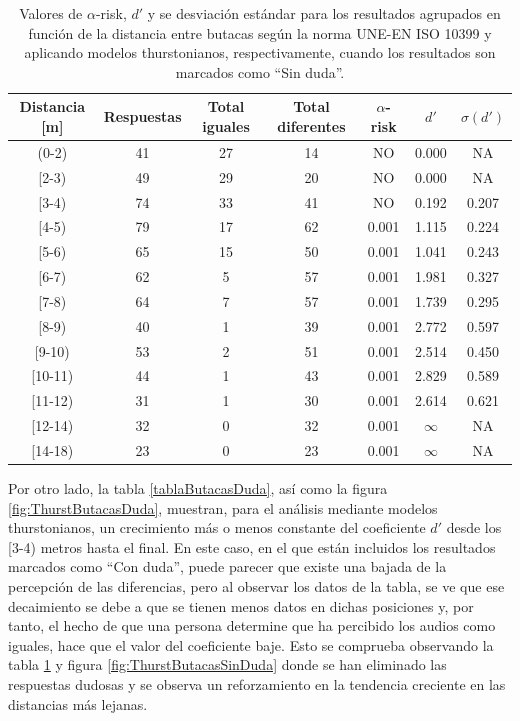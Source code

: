 \documentclass[11pt,a4paper,twoside]{book}
\begin{document}
		    \begin{table}[H]
			\begin{center}
			\begin{scriptsize}
			\begin{tabular}{| c | c | c | c || c | c | c |}
			    \hline
				\textbf{Distancia [m]}&\textbf{Respuestas}&\textbf{Total iguales}&\textbf{Total diferentes}&\textbf{$\alpha$-risk}&\textbf{$d'$}&\textbf{$\sigma (d')$}\\ \hline
                (0-2)&41&27&14&NO&0.000&NA\\ \hline
                [2-3)&49&29&20&NO&0.000&NA\\ \hline
                [3-4)&74&33&41&NO&0.192&0.207\\ \hline
                [4-5)&79&17&62&0.001&1.115&0.224\\ \hline
                [5-6)&65&15&50&0.001&1.041&0.243\\ \hline
                [6-7)&62&5&57&0.001&1.981&0.327\\ \hline
                [7-8)&64&7&57&0.001&1.739&0.295\\ \hline
                [8-9)&40&1&39&0.001&2.772&0.597\\ \hline
                [9-10)&53&2&51&0.001&2.514&0.450\\ \hline
                [10-11)&44&1&43&0.001&2.829&0.589\\ \hline
                [11-12)&31&1&30&0.001&2.614&0.621\\ \hline
                [12-14)&32&0&32&0.001&$\infty$&NA\\ \hline
                [14-18)&23&0&23&0.001&$\infty$&NA\\ \hline
			\end{tabular}
			\caption{Valores de $\alpha$-risk, $d'$ y se desviación estándar para los resultados agrupados en función de la distancia entre butacas según la norma UNE-EN ISO 10399 y aplicando modelos thurstonianos, respectivamente, cuando los resultados son marcados como ``Sin duda''.}
			\label{tablaButacasSinDuda}
			\end{scriptsize}
			\end{center}	
		    \end{table}
            
            
            Por otro lado, la tabla \ref{tablaButacasDuda}, así como la figura \ref{fig:ThurstButacasDuda}, muestran, para el análisis mediante modelos thurstonianos, un crecimiento más o menos constante del coeficiente $d'$ desde los [3-4) metros hasta el final. En este caso, en el que están incluidos los resultados marcados como ``Con duda'', puede parecer que existe una bajada de la percepción de las diferencias, pero al observar los datos de la tabla, se ve que ese decaimiento se debe a que se tienen menos datos en dichas posiciones y, por tanto, el hecho de que una persona determine que ha percibido los audios como iguales, hace que el valor del coeficiente baje. Esto se comprueba observando la tabla \ref{tablaButacasSinDuda} y figura \ref{fig:ThurstButacasSinDuda} donde se han eliminado las respuestas dudosas y se observa un reforzamiento en la tendencia creciente en las distancias más lejanas.
		    
\end{document}
